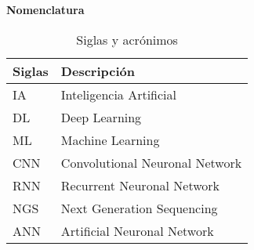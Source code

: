 \documentclass[12pt,letterpaper]{article}
\numberwithin{equation}{section}
\numberwithin{figure}{section}
\numberwithin{table}{section}
\begin{document}



\newpage
\listoffigures
{}

\newpage
\listoftables
{}

\newpage
{}


\textbf{\Large{Nomenclatura}}

\begin{table}[h]

    \centering
    \caption{Siglas y acrónimos}
    \vspace{0.3cm}
    \begin{tabular}{
    >{\centering\arraybackslash}m{3cm}
    >{\centering\arraybackslash}m{12cm}} \hline

\textbf{Siglas} & 
\textbf{Descripción} \\ \hline\hline

    IA & Inteligencia Artificial
\\[0.2cm]

   DL & Deep Learning
\\[0.2cm]

   ML & Machine Learning 
\\[0.2cm]

   CNN & Convolutional Neuronal Network
\\[0.2cm]
   RNN & Recurrent Neuronal Network 
\\[0.2cm]
   NGS & Next Generation Sequencing 
\\[0.2cm]
   ANN & Artificial Neuronal Network 
\\[0.2cm]

\hline
    \end{tabular}
\end{table}

\newpage

\setcounter{page}{1} %








\newpage
\end{document}
